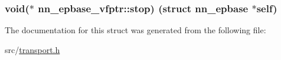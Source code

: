 \subsubsection[{stop}]{\setlength{\rightskip}{0pt plus 5cm}void($\ast$ nn\+\_\+epbase\+\_\+vfptr\+::stop) (struct {\bf nn\+\_\+epbase} $\ast$self)}\hypertarget{structnn__epbase__vfptr_ab512201fc6ce1ea50d196ea1201aa37d}{}\label{structnn__epbase__vfptr_ab512201fc6ce1ea50d196ea1201aa37d}


The documentation for this struct was generated from the following file\+:\begin{DoxyCompactItemize}
\item 
src/\hyperlink{transport_8h}{transport.\+h}\end{DoxyCompactItemize}
